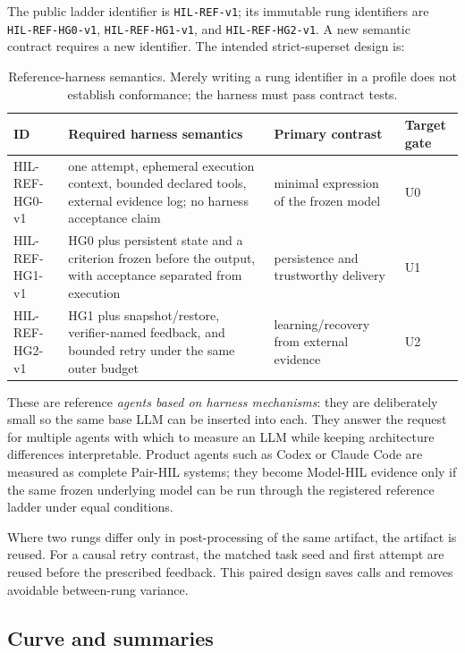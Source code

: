\documentclass[11pt]{article}
\theoremstyle{definition}
\begin{document}
The public ladder identifier is \texttt{HIL-REF-v1}; its immutable rung identifiers are \texttt{HIL-REF-HG0-v1}, \texttt{HIL-REF-HG1-v1}, and \texttt{HIL-REF-HG2-v1}. A new semantic contract requires a new identifier. The intended strict-superset design is:

\begin{table}[H]
\centering\small
\begin{tabularx}{\textwidth}{@{}lYYl@{}}
\toprule
ID & Required harness semantics & Primary contrast & Target gate \\
\midrule
HIL-REF-HG0-v1 & one attempt, ephemeral execution context, bounded declared tools, external evidence log; no harness acceptance claim & minimal expression of the frozen model & U0 \\
HIL-REF-HG1-v1 & HG0 plus persistent state and a criterion frozen before the output, with acceptance separated from execution & persistence and trustworthy delivery & U1 \\
HIL-REF-HG2-v1 & HG1 plus snapshot/restore, verifier-named feedback, and bounded retry under the same outer budget & learning/recovery from external evidence & U2 \\
\bottomrule
\end{tabularx}
\caption{Reference-harness semantics. Merely writing a rung identifier in a profile does not establish conformance; the harness must pass contract tests.}
\label{tab:ladder}
\end{table}

These are reference \emph{agents based on harness mechanisms}: they are deliberately small so the same base LLM can be inserted into each. They answer the request for multiple agents with which to measure an LLM while keeping architecture differences interpretable. Product agents such as Codex or Claude Code are measured as complete Pair-HIL systems; they become Model-HIL evidence only if the same frozen underlying model can be run through the registered reference ladder under equal conditions.

Where two rungs differ only in post-processing of the same artifact, the artifact is reused. For a causal retry contrast, the matched task seed and first attempt are reused before the prescribed feedback. This paired design saves calls and removes avoidable between-rung variance.

\subsection{Curve and summaries}
\end{document}
